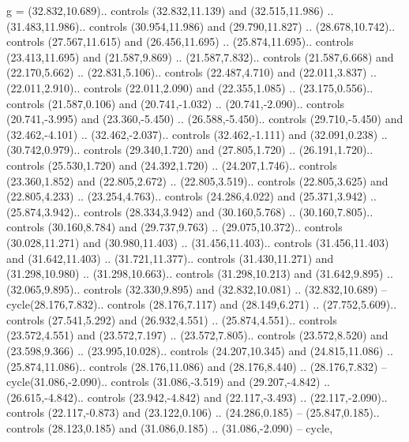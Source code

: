 {g} = {(32.832,10.689).. controls (32.832,11.139) and (32.515,11.986) .. (31.483,11.986).. controls (30.954,11.986) and (29.790,11.827) .. (28.678,10.742).. controls (27.567,11.615) and (26.456,11.695) .. (25.874,11.695).. controls (23.413,11.695) and (21.587,9.869) .. (21.587,7.832).. controls (21.587,6.668) and (22.170,5.662) .. (22.831,5.106).. controls (22.487,4.710) and (22.011,3.837) .. (22.011,2.910).. controls (22.011,2.090) and (22.355,1.085) .. (23.175,0.556).. controls (21.587,0.106) and (20.741,-1.032) .. (20.741,-2.090).. controls (20.741,-3.995) and (23.360,-5.450) .. (26.588,-5.450).. controls (29.710,-5.450) and (32.462,-4.101) .. (32.462,-2.037).. controls (32.462,-1.111) and (32.091,0.238) .. (30.742,0.979).. controls (29.340,1.720) and (27.805,1.720) .. (26.191,1.720).. controls (25.530,1.720) and (24.392,1.720) .. (24.207,1.746).. controls (23.360,1.852) and (22.805,2.672) .. (22.805,3.519).. controls (22.805,3.625) and (22.805,4.233) .. (23.254,4.763).. controls (24.286,4.022) and (25.371,3.942) .. (25.874,3.942).. controls (28.334,3.942) and (30.160,5.768) .. (30.160,7.805).. controls (30.160,8.784) and (29.737,9.763) .. (29.075,10.372).. controls (30.028,11.271) and (30.980,11.403) .. (31.456,11.403).. controls (31.456,11.403) and (31.642,11.403) .. (31.721,11.377).. controls (31.430,11.271) and (31.298,10.980) .. (31.298,10.663).. controls (31.298,10.213) and (31.642,9.895) .. (32.065,9.895).. controls (32.330,9.895) and (32.832,10.081) .. (32.832,10.689) -- cycle(28.176,7.832).. controls (28.176,7.117) and (28.149,6.271) .. (27.752,5.609).. controls (27.541,5.292) and (26.932,4.551) .. (25.874,4.551).. controls (23.572,4.551) and (23.572,7.197) .. (23.572,7.805).. controls (23.572,8.520) and (23.598,9.366) .. (23.995,10.028).. controls (24.207,10.345) and (24.815,11.086) .. (25.874,11.086).. controls (28.176,11.086) and (28.176,8.440) .. (28.176,7.832) -- cycle(31.086,-2.090).. controls (31.086,-3.519) and (29.207,-4.842) .. (26.615,-4.842).. controls (23.942,-4.842) and (22.117,-3.493) .. (22.117,-2.090).. controls (22.117,-0.873) and (23.122,0.106) .. (24.286,0.185) -- (25.847,0.185).. controls (28.123,0.185) and (31.086,0.185) .. (31.086,-2.090) -- cycle},

